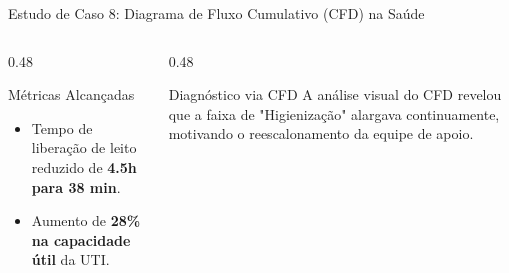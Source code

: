 \documentclass[aspectratio=169, 9pt]{beamer}
\begin{document}
\begin{frame}{Estudo de Caso 8: Diagrama de Fluxo Cumulativo (CFD) na Saúde}
  \vspace{-0.1cm}

  \begin{columns}[T]
    \begin{column}{0.48\textwidth}
      \begin{exampleblock}{Métricas Alcançadas}
        \begin{itemize}
          \item Tempo de liberação de leito reduzido de \textbf{4.5h para 38 min}.
          \item Aumento de \textbf{28\% na capacidade útil} da UTI.
        \end{itemize}
      \end{exampleblock}
    \end{column}

    \begin{column}{0.48\textwidth}
      \begin{alertblock}{Diagnóstico via CFD}
        A análise visual do CFD revelou que a faixa de "Higienização" alargava continuamente, motivando o reescalonamento da equipe de apoio.
      \end{alertblock}
    \end{column}
  \end{columns}
\end{frame}
\end{document}
